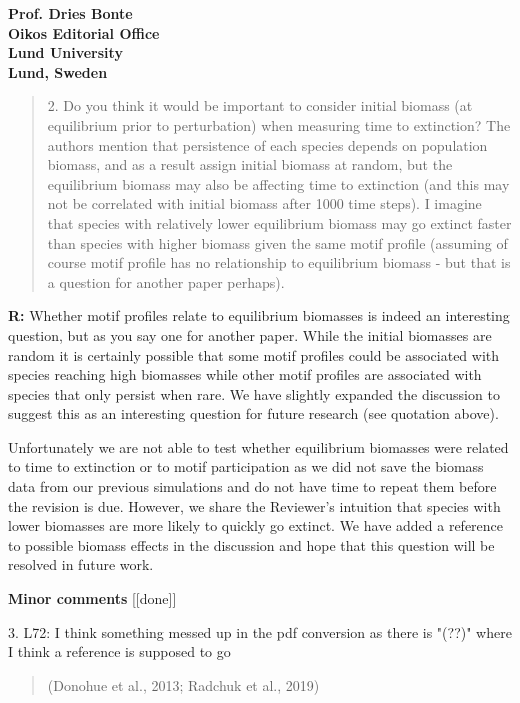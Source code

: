 \documentclass[12pt]{letter}
\begin{document}
\begin{letter}{\bf Prof. Dries Bonte\\
Oikos Editorial Office \\
Lund University \\
Lund, Sweden}

    \smallskip

    \begin{quotation}
      2. Do you think it would be important to consider initial biomass (at equilibrium prior to perturbation) when measuring time to extinction? The authors mention that persistence of each species depends on population biomass, and as a result assign initial biomass at random, but the equilibrium biomass may also be affecting time to extinction (and this may not be correlated with initial biomass after 1000 time steps). I imagine that species with relatively lower equilibrium biomass may go extinct faster than species with higher biomass given the same motif profile (assuming of course motif profile has no relationship to equilibrium biomass - but that is a question for another paper perhaps).   
    \end{quotation}

    \smallskip

    \textbf{R:} Whether motif profiles relate to equilibrium biomasses is indeed an interesting question, but as you say one for another paper. While the initial biomasses are random it is certainly possible that some motif profiles could be associated with species reaching high biomasses while other motif profiles are associated with species that only persist when rare. We have slightly expanded the discussion to suggest this as an interesting question for future research (see quotation above).


    Unfortunately we are not able to test whether equilibrium biomasses were related to time to extinction or to motif participation as we did not save the biomass data from our previous simulations and do not have time to repeat them before the revision is due. However, we share the Reviewer's intuition that species with lower biomasses are more likely to quickly go extinct. We have added a reference to possible biomass effects in the discussion and hope that this question will be resolved in future work.


    \smallskip


  \textbf{Minor comments} [[done]]

    3. L72: I think something messed up in the pdf conversion as there is "(??)" where I think a reference is supposed to go
    \begin{quotation}
    (Donohue et al., 2013; Radchuk et al., 2019)
    \end{quotation}


\end{letter}
\end{document}
